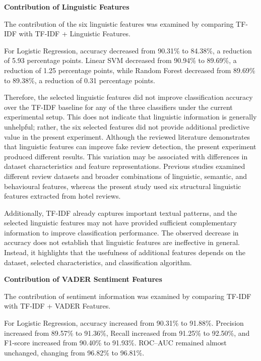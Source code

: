 \documentclass[12pt,a4paper]{report}
\begin{document}
\vspace{0.3cm}
\noindent\textbf{Contribution of Linguistic Features}

The contribution of the six linguistic features was examined by
comparing TF-IDF with TF-IDF + Linguistic Features.

For Logistic Regression, accuracy decreased from 90.31\% to 84.38\%,
a reduction of 5.93 percentage points. Linear SVM decreased from
90.94\% to 89.69\%, a reduction of 1.25 percentage points, while
Random Forest decreased from 89.69\% to 89.38\%, a reduction of
0.31 percentage points.

Therefore, the selected linguistic features did not improve
classification accuracy over the TF-IDF baseline for any of the
three classifiers under the current experimental setup. This does not
indicate that linguistic information is generally unhelpful; rather,
the six selected features did not provide additional predictive value
in the present experiment.
Although the reviewed literature demonstrates that linguistic
features can improve fake review detection, the present
experiment produced different results. This variation may
be associated with differences in dataset characteristics
and feature representations. Previous studies examined
different review datasets and broader combinations of
linguistic, semantic, and behavioural features, whereas
the present study used six structural linguistic features
extracted from hotel reviews.

Additionally, TF-IDF already captures important textual
patterns, and the selected linguistic features may not
have provided sufficient complementary information to
improve classification performance. The observed decrease
in accuracy does not establish that linguistic features
are ineffective in general. Instead, it highlights that
the usefulness of additional features depends on the
dataset, selected characteristics, and classification
algorithm.

\vspace{0.3cm}
\noindent\textbf{Contribution of VADER Sentiment Features}

The contribution of sentiment information was examined by comparing
TF-IDF with TF-IDF + VADER Features.

For Logistic Regression, accuracy increased from 90.31\% to 91.88\%.
Precision increased from 89.57\% to 91.36\%, Recall increased from
91.25\% to 92.50\%, and F1-score increased from 90.40\% to 91.93\%.
ROC--AUC remained almost unchanged, changing from 96.82\% to 96.81\%.
\end{document}
